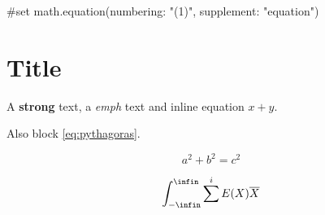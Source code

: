 \iftypst
#set math.equation(numbering: "(1)", supplement: "equation")
\fi

\section{Title}

A \textbf{strong} text, a \emph{emph} text and inline equation $x + y$.

Also block \eqref{eq:pythagoras}.

\begin{equation}
a^2 + b^2 = c^2 \label{eq:pythagoras}
\end{equation}

$$ \int_{-\infin}^{\infin} \sum^i E(X) \overline{X} $$